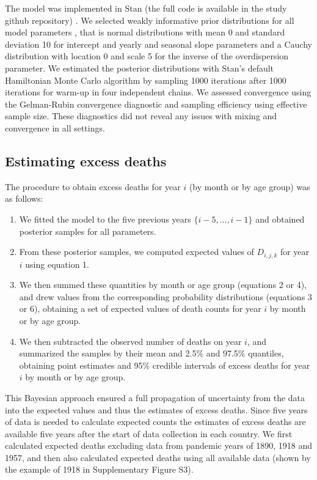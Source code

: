 \documentclass{article}
\begin{document}
	The model was implemented in Stan (the full code is available in the study github repository) \cite{carpenter2017stan}. We selected weakly informative prior distributions for all model parameters \cite{gelman2020regression,gelman2008weakly}, that is normal distributions with mean 0 and standard deviation 10 for intercept and yearly and seasonal slope parameters and a Cauchy distribution with location 0 and scale 5 for the inverse of the overdispersion parameter. We estimated the posterior distributions with Stan's default Hamiltonian Monte Carlo algorithm \cite{hoffman2014no} by sampling 1000 iterations after 1000 iterations for warm-up in four independent chains. We assessed convergence using the Gelman-Rubin convergence diagnostic and sampling efficiency using effective sample size. These diagnostics did not reveal any issues with mixing and convergence in all settings.
	
	\subsection{Estimating excess deaths}
	
	The procedure to obtain excess deaths for year $i$ (by month or by age group) was as follows:
	\begin{enumerate}
		\item We fitted the model to the five previous years $\{i-5,\ldots,i-1\}$ and obtained posterior samples for all parameters.
		\item From these posterior samples, we computed expected values of $D_{i,j,k}$ for year $i$ using equation 1.
		\item We then summed these quantities by month or age group (equations 2 or 4), and drew values from the corresponding probability distributions (equations 3 or 6), obtaining a set of expected values of death counts for year $i$ by month or by age group. 
		\item We then subtracted the observed number of deaths on year $i$, and summarized the samples by their mean and 2.5\% and 97.5\% quantiles, obtaining point estimates and 95\% credible intervals of excess deaths for year $i$ by month or by age group. 
	\end{enumerate} 
	This Bayesian approach ensured a full propagation of uncertainty from the data into the expected values and thus the estimates of excess deaths.
	Since five years of data is needed to calculate expected counts the estimates of excess deaths are available five years after the start of data collection in each country. We first calculated expected deaths excluding data from pandemic years of 1890, 1918 and 1957, and then also calculated expected deaths using all available data (shown by the example of 1918 in Supplementary Figure S3).
\end{document}
